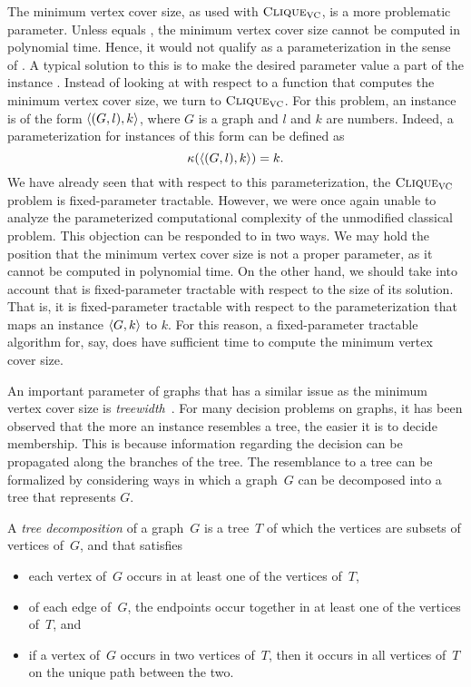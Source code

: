 The minimum vertex cover size, as used with $\textnormal{\textsc{Clique}}_{\textnormal{\textsc{VC}}}$, is a more problematic parameter.
Unless  equals , the minimum vertex cover size cannot be computed in polynomial time.
Hence, it would not qualify as a parameterization in the sense of \citeauthor{flum2006parameterized}.
A typical solution to this is to make the desired parameter value a part of the instance \parencite[for instance][Section~15.2.4]{cygan2015parameterized}.
Instead of looking at  with respect to a function that computes the minimum vertex cover size, we turn to $\textnormal{\textsc{Clique}}_{\textnormal{\textsc{VC}}}$.
For this problem, an instance is of the form ${\langle (G, l), k\rangle}$, where $G$ is a graph and $l$ and $k$ are numbers.
Indeed, a parameterization for instances of this form can be defined as
\begin{equation*}
  \kappa({\langle (G, l), k\rangle}) = k.
\end{equation*}
We have already seen that with respect to this parameterization, the $\textnormal{\textsc{Clique}}_{\textnormal{\textsc{VC}}}$ problem is fixed-parameter tractable.
However, we were once again unable to analyze the parameterized computational complexity of the unmodified classical  problem.
This objection can be responded to in two ways.
We may hold the position that the minimum vertex cover size is not a proper parameter, as it cannot be computed in polynomial time.
On the other hand, we should take into account that  is fixed-parameter tractable with respect to the size of its solution.
That is, it is fixed-parameter tractable with respect to the parameterization that maps an instance ${\langle G, k\rangle}$ to $k$.
For this reason, a fixed-parameter tractable algorithm for, say,  does have sufficient time to compute the minimum vertex cover size.

An important parameter of graphs that has a similar issue as the minimum vertex cover size is \emph{treewidth}~\parencite{robertson1986graph,bodlaender1998partial}.
For many decision problems on graphs, it has been observed that the more an instance resembles a tree, the easier it is to decide membership.
This is because information regarding the decision can be propagated along the branches of the tree.
The resemblance to a tree can be formalized by considering ways in which a graph~$G$ can be decomposed into a tree that represents $G$.
\begin{definition}
  A \emph{tree decomposition} of a graph~$G$ is a tree~$T$ of which the vertices are subsets of vertices of~$G$, and that satisfies
  \begin{itemize}
  \item
    each vertex of~$G$ occurs in at least one of the vertices of~$T$,
  \item
    of each edge of~$G$, the endpoints occur together in at least one of the vertices of~$T$, and
  \item
    if a vertex of~$G$ occurs in two vertices of~$T$, then it occurs in all vertices of~$T$ on the unique path between the two.
  \end{itemize}
\end{definition}


